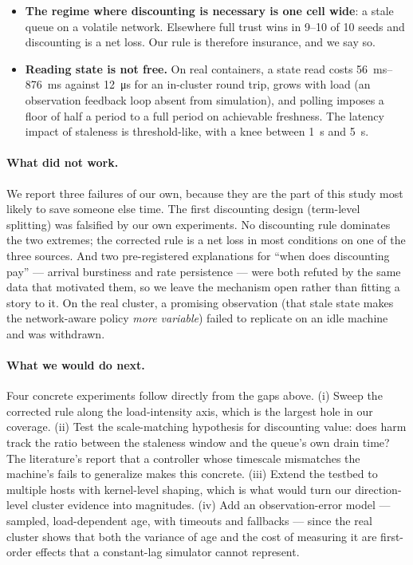 \begin{itemize}
        channel retains $90$--$99\%$ of the benefit under a \SI{60}{\second}-old link snapshot,
        where uniform and threshold discounting destroy all of it.
  \item \textbf{The regime where discounting is necessary is one cell wide}: a stale queue on a
        volatile network. Elsewhere full trust wins in 9--10 of 10 seeds and discounting is a net
        loss. Our rule is therefore insurance, and we say so.
  \item \textbf{Reading state is not free.} On real containers, a state read costs
        \SIrange{56}{876}{\milli\second} against \SI{12}{\micro\second} for an in-cluster round
        trip, grows with load (an observation feedback loop absent from simulation), and polling
        imposes a floor of half a period to a full period on achievable freshness. The latency
        impact of staleness is threshold-like, with a knee between \SI{1}{\second} and
        \SI{5}{\second}.
\end{itemize}

\paragraph{What did not work.}
We report three failures of our own, because they are the part of this study most likely to save
someone else time. The first discounting design (term-level splitting) was falsified by our own
experiments. No discounting rule dominates the two extremes; the corrected rule is a net loss in
most conditions on one of the three sources. And two pre-registered explanations for ``when does
discounting pay'' --- arrival burstiness and rate persistence --- were both refuted by the same
data that motivated them, so we leave the mechanism open rather than fitting a story to it. On
the real cluster, a promising observation (that stale state makes the network-aware policy
\emph{more variable}) failed to replicate on an idle machine and was withdrawn.

\paragraph{What we would do next.}
Four concrete experiments follow directly from the gaps above. (i) Sweep the corrected rule along
the load-intensity axis, which is the largest hole in our coverage. (ii) Test the scale-matching
hypothesis for discounting value: does harm track the ratio between the staleness window and the
queue's own drain time? The literature's report that a controller whose timescale mismatches the
machine's fails to generalize \cite{dlfp} makes this concrete. (iii) Extend the testbed to
multiple hosts with kernel-level shaping, which is what would turn our direction-level cluster
evidence into magnitudes. (iv) Add an observation-error model --- sampled, load-dependent age,
with timeouts and fallbacks --- since the real cluster shows that both the variance of age and
the cost of measuring it are first-order effects that a constant-lag simulator cannot represent.

